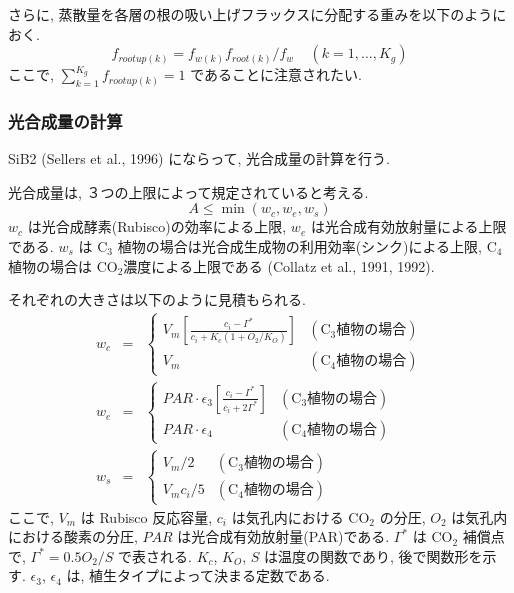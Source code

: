 さらに, 蒸散量を各層の根の吸い上げフラックスに分配する重みを以下のように
おく.
\begin{equation}
 f_{rootup(k)} = f_{w(k)} f_{root(k)} / f_w
\ \ \ \ \ (k=1,\ldots,K_g)
\end{equation}
ここで, $\sum_{k=1}^{K_g} f_{rootup(k)} = 1$ であることに注意されたい.

\subsubsection{光合成量の計算}

SiB2 (Sellers et al., 1996) にならって, 光合成量の計算を行う.

光合成量は, ３つの上限によって規定されていると考える.
\begin{equation}
 A \leq \min( w_c, w_e, w_s) \label{photo_a}
\end{equation}
$w_c$ は光合成酵素(Rubisco)の効率による上限,
$w_e$ は光合成有効放射量による上限である.
$w_s$ は C$_3$ 植物の場合は光合成生成物の利用効率(シンク)による上限,
C$_4$ 植物の場合は CO$_2$濃度による上限である
(Collatz et al., 1991, 1992).

それぞれの大きさは以下のように見積もられる.
\begin{eqnarray}
 w_c &=& \left\{
\begin{array}{ll}
\displaystyle{
V_m \left[ \frac{c_i - \Gamma^*}{c_i + K_c(1+O_2/K_O)}\right]
}
 & (\mbox{C$_3$植物の場合})\\
 V_m
 & (\mbox{C$_4$植物の場合})
\end{array}
\right. \\
 w_e &=& \left\{
\begin{array}{ll}
\displaystyle{
PAR\cdot \epsilon_3 \left[ \frac{c_i-\Gamma^*}{c_i+2\Gamma^*}\right]
}
 & (\mbox{C$_3$植物の場合})\\
PAR\cdot \epsilon_4
 & (\mbox{C$_4$植物の場合})
\end{array}
\right. \\
 w_s &=& \left\{
\begin{array}{ll}
V_m / 2
 & (\mbox{C$_3$植物の場合})\\
V_m c_i/ 5
 & (\mbox{C$_4$植物の場合})
\end{array}
\right.
\end{eqnarray}
ここで, $V_m$ は Rubisco 反応容量, $c_i$ は気孔内における CO$_2$ の分圧,
$O_2$ は気孔内における酸素の分圧, $PAR$ は光合成有効放射量(PAR)である.
$\Gamma^*$ は CO$_2$ 補償点で, $\Gamma^* = 0.5 O_2 / S$ で表される.
$K_c$, $K_O$, $S$ は温度の関数であり, 後で関数形を示す.
$\epsilon_3$, $\epsilon_4$ は, 植生タイプによって決まる定数である.

